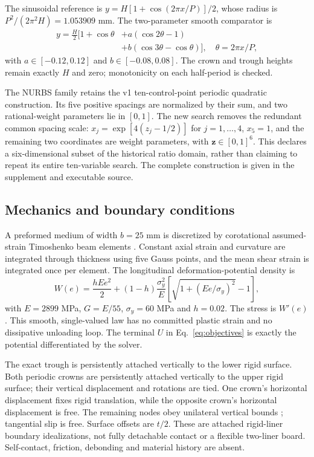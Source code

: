 \documentclass[10pt,twocolumn]{article}
\begin{document}
The sinusoidal reference is $y=H[1+\cos(2\pi x/P)]/2$, whose radius is $P^2/(2\pi^2 H)=1.053909$ mm. The two-parameter smooth comparator is
\begin{align}
 y=\frac H2[1+\cos\theta
 &+a(\cos2\theta-1)\nonumber\\
 &+b(\cos3\theta-\cos\theta)],\quad\theta=2\pi x/P, \label{eq:fourier}
\end{align}
with $a\in[-0.12,0.12]$ and $b\in[-0.08,0.08]$. The crown and trough heights remain exactly $H$ and zero; monotonicity on each half-period is checked.

The NURBS family retains the v1 ten-control-point periodic quadratic construction. Its five positive spacings are normalized by their sum, and two rational-weight parameters lie in $[0,1]$. The new search removes the redundant common spacing scale: $x_j=\exp[4(z_j-1/2)]$ for $j=1,\ldots,4$, $x_5=1$, and the remaining two coordinates are weight parameters, with $\mathbf z\in[0,1]^6$. This declares a six-dimensional subset of the historical ratio domain, rather than claiming to repeat its entire ten-variable search. The complete construction is given in the supplement and executable source.

\subsection{Mechanics and boundary conditions}
A preformed medium of width $b=25$ mm is discretized by corotational assumed-strain Timoshenko beam elements \citep{Crisfield1991}. Constant axial strain and curvature are integrated through thickness using five Gauss points, and the mean shear strain is integrated once per element. The longitudinal deformation-potential density is
\begin{equation}
 W(e)=\frac{hE e^2}{2}+(1-h)\frac{\sigma_y^2}{E}
 \left[\sqrt{1+(Ee/\sigma_y)^2}-1\right], \label{eq:energy}
\end{equation}
with $E=2899$ MPa, $G=E/55$, $\sigma_y=60$ MPa and $h=0.02$. The stress is $W'(e)$. This smooth, single-valued law has no committed plastic strain and no dissipative unloading loop. The terminal $U$ in Eq.~\eqref{eq:objectives} is exactly the potential differentiated by the solver.

The exact trough is persistently attached vertically to the lower rigid surface. Both periodic crowns are persistently attached vertically to the upper rigid surface; their vertical displacement and rotations are tied. One crown's horizontal displacement fixes rigid translation, while the opposite crown's horizontal displacement is free. The remaining nodes obey unilateral vertical bounds \citep{Wriggers2006}; tangential slip is free. Surface offsets are $t/2$. These are attached rigid-liner boundary idealizations, not fully detachable contact or a flexible two-liner board. Self-contact, friction, debonding and material history are absent.
\end{document}
